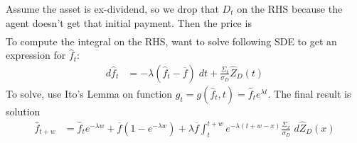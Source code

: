 \documentclass[12pt]{article}
\theoremstyle{plain}
\theoremstyle{definition}
\theoremstyle{remark}
\begin{document}
\clearpage
Assume the asset is ex-dividend, so we drop that $D_t$ on the RHS
because the agent doesn't get that initial payment. Then the price is
\begin{align*}
\end{align*}
To compute the integral on the RHS, want to solve following SDE
to get an expression for $\hat{f}_t$:
\begin{align*}
  d\hat{f}_t
  &=
  -\lambda(
  \hat{f}_t-\overline{f}
  )\;dt
  +
  \frac{\Sigma_t}{\sigma_D}
  \hat{Z}_D(t)
\end{align*}
To solve, use Ito's Lemma on function
$g_t = g(\hat{f}_t,t) = \hat{f}_t e^{\lambda t}$.
The final result is solution
\begin{align*}
  \hat{f}_{t+w}
  &=
  \hat{f}_{t}
  e^{-\lambda w}
  +
  \overline{f}
  (1-e^{-\lambda w})
  +
  \lambda \overline{f}
  \int_t^{t+w}
  e^{-\lambda (t+w-x)}
  \frac{\Sigma_x}{\sigma_D}
  \;d\hat{Z}_D(x)
\end{align*}
\end{document}
